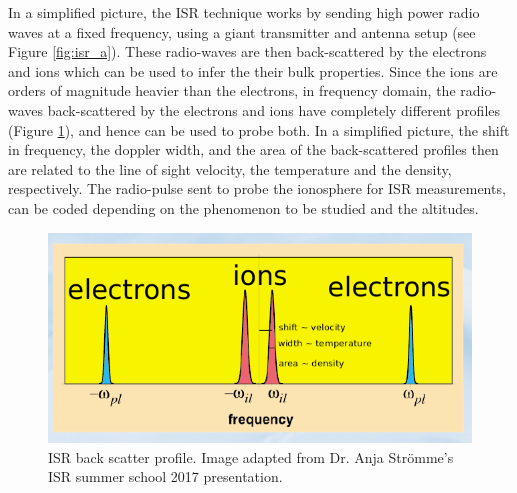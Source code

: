 \documentclass[crop=false,class=mitthesis,oneside,font=12pt]{standalone}
\begin{document}
In a simplified picture, the ISR technique works by sending high power radio waves at a fixed frequency, using a giant transmitter and antenna setup (see Figure \ref{fig:isr_a}). These radio-waves are then back-scattered by the electrons and ions which can be used to infer the their bulk properties. Since the ions are orders of magnitude heavier than the electrons, in frequency domain, the radio-waves back-scattered by the electrons and ions have completely different profiles (Figure \ref{fig:isr}), and hence can be used to probe both. In a simplified picture, the shift in frequency, the doppler width, and the area of the back-scattered profiles then are related to the line of sight velocity, the temperature and the density, respectively. The radio-pulse sent to probe the ionosphere for ISR measurements, can be coded depending on the phenomenon to be studied and the altitudes.
\begin{figure}[H]
	\centering\includegraphics[width=30pc]{isr.png}
	\caption{ISR back scatter profile. Image adapted from Dr. Anja Str{\"o}mme's ISR summer school 2017 presentation.}
	\label{fig:isr}
\end{figure}
\end{document}
